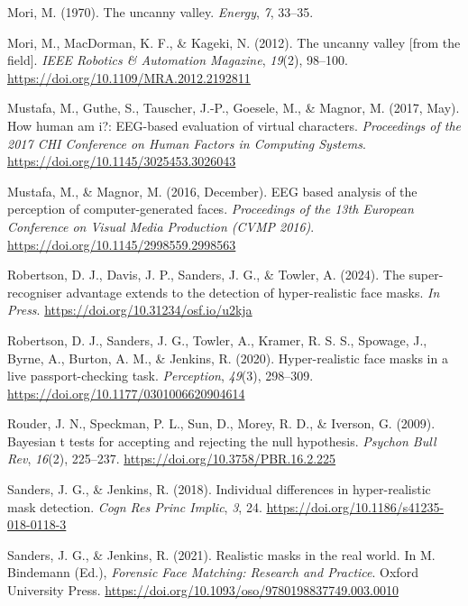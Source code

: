 \documentclass[
]{article}
\newlength{\cslhangindent}
\newenvironment{CSLReferences}[2] %
 {\begin{list}{}{%
  \setlength{\itemindent}{0pt}
  \setlength{\leftmargin}{0pt}
  \setlength{\parsep}{0pt}
  \ifodd #1
   \setlength{\leftmargin}{\cslhangindent}
   \setlength{\itemindent}{-1\cslhangindent}
  \fi
  \setlength{\itemsep}{#2\baselineskip}}}
 {\end{list}}
\begin{document}
\begin{CSLReferences}{1}{0}
Mori, M. (1970). The uncanny valley. \emph{Energy}, \emph{7}, 33--35.

Mori, M., MacDorman, K. F., \& Kageki, N. (2012). The uncanny valley {[}from the field{]}. \emph{IEEE Robotics \& Automation Magazine}, \emph{19}(2), 98--100. \url{https://doi.org/10.1109/MRA.2012.2192811}

Mustafa, M., Guthe, S., Tauscher, J.-P., Goesele, M., \& Magnor, M. (2017, May). How human am i?: EEG-based evaluation of virtual characters. \emph{Proceedings of the 2017 CHI Conference on Human Factors in Computing Systems}. \url{https://doi.org/10.1145/3025453.3026043}

Mustafa, M., \& Magnor, M. (2016, December). EEG based analysis of the perception of computer-generated faces. \emph{Proceedings of the 13th European Conference on Visual Media Production (CVMP 2016)}. \url{https://doi.org/10.1145/2998559.2998563}

Robertson, D. J., Davis, J. P., Sanders, J. G., \& Towler, A. (2024). The super-recogniser advantage extends to the detection of hyper-realistic face masks. \emph{In Press}. \url{https://doi.org/10.31234/osf.io/u2kja}

Robertson, D. J., Sanders, J. G., Towler, A., Kramer, R. S. S., Spowage, J., Byrne, A., Burton, A. M., \& Jenkins, R. (2020). Hyper-realistic face masks in a live passport-checking task. \emph{Perception}, \emph{49}(3), 298--309. \url{https://doi.org/10.1177/0301006620904614}

Rouder, J. N., Speckman, P. L., Sun, D., Morey, R. D., \& Iverson, G. (2009). Bayesian t tests for accepting and rejecting the null hypothesis. \emph{Psychon Bull Rev}, \emph{16}(2), 225--237. \url{https://doi.org/10.3758/PBR.16.2.225}

Sanders, J. G., \& Jenkins, R. (2018). Individual differences in hyper-realistic mask detection. \emph{Cogn Res Princ Implic}, \emph{3}, 24. \url{https://doi.org/10.1186/s41235-018-0118-3}

Sanders, J. G., \& Jenkins, R. (2021). Realistic masks in the real world. In M. Bindemann (Ed.), \emph{{Forensic Face Matching: Research and Practice}}. Oxford University Press. \url{https://doi.org/10.1093/oso/9780198837749.003.0010}


\end{CSLReferences}
\end{document}

